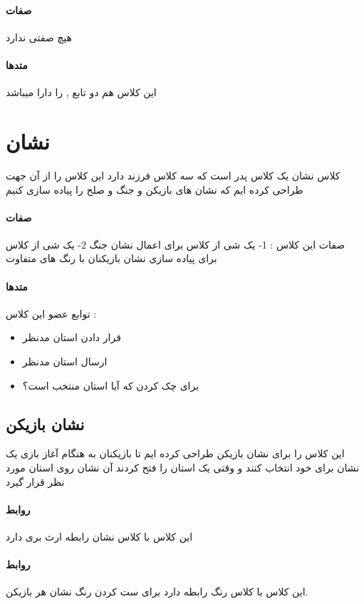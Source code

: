 \documentclass[pdf,titlepage,a4paper]{report}
\begin{document}
	\paragraph{صفات}
	هیچ صفتی ندارد 
	\paragraph{متدها}
	این کلاس هم دو تابع  ,  را دارا میباشد
	\newpage
	
	\section{نشان}
	کلاس نشان یک کلاس پدر است که سه کلاس فرزند دارد این کلاس را از آن جهت طراحی کرده ایم که نشان های بازیکن و جنگ و صلح را پیاده سازی کنیم
	\paragraph{صفات}
     صفات این کلاس :
	 1- یک شی از کلاس   برای اعمال نشان جنگ
	 2- یک شی از کلاس  برای پیاده سازی نشان بازیکنان با رنگ های متفاوت
	\paragraph{متدها}
	 توابع عضو این کلاس :

	\begin{itemize}
		\item {} قرار دادن استان مدنظر
		\item {} ارسال استان مدنظر 
		\item {}برای چک کردن که آیا استان منتخب است؟
	\end{itemize}
	 
	\subsection{نشان بازیکن}
	این کلاس را برای نشان بازیکن طراحی کرده ایم تا بازیکنان به هنگام آغاز بازی یک نشان برای خود انتخاب کنند و وقتی یک استان را فتح کردند آن نشان روی استان مورد نظر قرار گیرد
	\paragraph{روابط}
	 این کلاس با کلاس نشان رابطه ارث بری دارد 
	\paragraph{روابط}
	این کلاس با کلاس رنگ رابطه دارد برای ست کردن رنگ نشان هر بازیکن.\\ 
\end{document}
